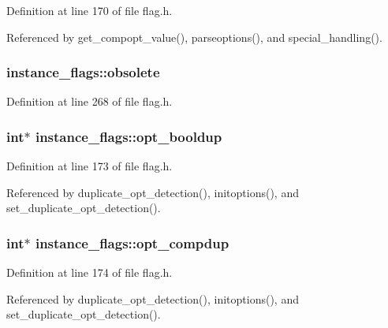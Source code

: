 Definition at line 170 of file flag.\+h.



Referenced by get\+\_\+compopt\+\_\+value(), parseoptions(), and special\+\_\+handling().

\hypertarget{structinstance__flags_ab0968d97c0dc56d2458bbc3ac6fd7025}{
\subsubsection[{obsolete}]{ instance\+\_\+flags\+::obsolete}}\label{structinstance__flags_ab0968d97c0dc56d2458bbc3ac6fd7025}


Definition at line 268 of file flag.\+h.

\hypertarget{structinstance__flags_aa640af33ff813343624e213b1edaa141}{
\subsubsection[{opt\+\_\+booldup}]{\setlength{\rightskip}{0pt plus 5cm}int$\ast$ instance\+\_\+flags\+::opt\+\_\+booldup}}\label{structinstance__flags_aa640af33ff813343624e213b1edaa141}


Definition at line 173 of file flag.\+h.



Referenced by duplicate\+\_\+opt\+\_\+detection(), initoptions(), and set\+\_\+duplicate\+\_\+opt\+\_\+detection().

\hypertarget{structinstance__flags_ab38b97d279578b2c1be5a67b87170d3f}{
\subsubsection[{opt\+\_\+compdup}]{\setlength{\rightskip}{0pt plus 5cm}int$\ast$ instance\+\_\+flags\+::opt\+\_\+compdup}}\label{structinstance__flags_ab38b97d279578b2c1be5a67b87170d3f}


Definition at line 174 of file flag.\+h.



Referenced by duplicate\+\_\+opt\+\_\+detection(), initoptions(), and set\+\_\+duplicate\+\_\+opt\+\_\+detection().

